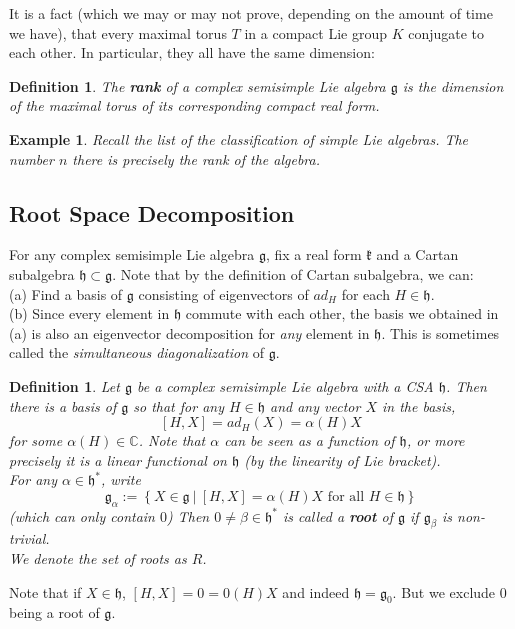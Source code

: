 \documentclass[11pt]{article}
\newtheorem{example}[theorem]{Example}
\newtheorem{definition}[theorem]{Definition}
\newcommand{\bb}[1]{\mathbb{#1}}
\newcommand{\mf}[1]{\mathfrak{#1}}
\begin{document}
It is a fact (which we may or may not prove, depending on the amount of time we have), that every maximal torus $T$ in a compact Lie group $K$ conjugate to each other. In particular, they all have the same dimension:
\begin{definition}
The \textbf{rank} of a complex semisimple Lie algebra $\mf{g}$ is the dimension of the maximal torus of its corresponding compact real form.
\end{definition}
\begin{example}
Recall the list of the classification of simple Lie algebras. The number $n$ there is precisely the rank of the algebra.
\end{example}

\subsection{Root Space Decomposition}
For any complex semisimple Lie algebra $\mf{g}$, fix a real form $\mf{k}$ and a Cartan subalgebra $\mf{h} \subset \mf{g}$. Note that by the definition of Cartan subalgebra, we can:\\
(a) Find a basis of $\mf{g}$ consisting of eigenvectors of $ad_H$ for each $H \in \mf{h}$.\\
(b) Since every element in $\mf{h}$ commute with each other, the basis we obtained in (a) is also an eigenvector decomposition for \textit{any} element in $\mf{h}$. This is sometimes called the \textit{simultaneous diagonalization} of $\mf{g}$.\\
\begin{definition}
Let $\mf{g}$ be a complex semisimple Lie algebra with a CSA $\mf{h}$. Then there is a basis of $\mf{g}$ so that for any $H \in \mf{h}$ and any vector $X$ in the basis,
$$[H,X] = ad_H(X) = \alpha(H)X$$
for some $\alpha(H) \in \bb{C}$. Note that $\alpha$ can be seen as a function of $\mf{h}$, or more precisely it is a linear functional on $\mf{h}$ (by the linearity of Lie bracket).\\
For any $\alpha \in \mf{h}^*$, write
$$\mf{g}_{\alpha} := \left\{ X \in \mf{g}\ \Big|\ [H,X] = \alpha(H)X \text{ for all }H \in \mf{h} \right\}$$
(which can only contain $0$) Then $0 \neq \beta \in \mf{h}^*$ is called a \textbf{root} of $\mf{g}$ if $\mf{g}_{\beta}$ is non-trivial.\\
We denote the set of roots as $R$.
\end{definition}
Note that if $X \in \mf{h}$, $[H,X] = 0 = 0(H)X$ and indeed $\mf{h} = \mf{g}_0$. But we exclude $0$ being a root of $\mf{g}$.
\end{document}
